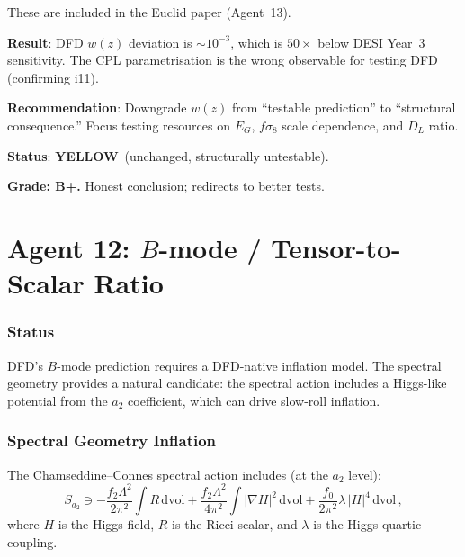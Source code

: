 \documentclass[11pt,a4paper]{article}
\newcommand{\YELLOW}{\textcolor{dfdyellow}{\textbf{YELLOW}}}
\begin{document}
These are included in the Euclid paper (Agent~13).

\begin{tcolorbox}[colback=yellow!5!white, colframe=yellow!60!black, title={Agent 11: $w(z)$ --- YELLOW (Structurally Small Signal)}]
\textbf{Result}: DFD $w(z)$ deviation is $\sim 10^{-3}$, which is $50\times$ below DESI Year~3 sensitivity. The CPL parametrisation is the wrong observable for testing DFD (confirming i11).

\textbf{Recommendation}: Downgrade $w(z)$ from ``testable prediction'' to ``structural consequence.'' Focus testing resources on $E_G$, $f\sigma_8$ scale dependence, and $D_L$ ratio.

\textbf{Status}: \YELLOW\ (unchanged, structurally untestable).

\textbf{Grade: B+.} Honest conclusion; redirects to better tests.
\end{tcolorbox}


\part{Agent 12: $B$-mode / Tensor-to-Scalar Ratio}
\label{part:bmode}

\section{Status}

DFD's $B$-mode prediction requires a DFD-native inflation model. The spectral geometry provides a natural candidate: the spectral action includes a Higgs-like potential from the $a_2$ coefficient, which can drive slow-roll inflation.

\section{Spectral Geometry Inflation}

The Chamseddine--Connes spectral action includes (at the $a_2$ level):
\begin{equation}
S_{a_2} \ni -\frac{f_2\Lambda^2}{2\pi^2}\int R\,\mathrm{dvol} + \frac{f_2\Lambda^2}{4\pi^2}\int |\nabla H|^2\,\mathrm{dvol} + \frac{f_0}{2\pi^2}\lambda\,|H|^4\,\mathrm{dvol}\,,
\end{equation}
where $H$ is the Higgs field, $R$ is the Ricci scalar, and $\lambda$ is the Higgs quartic coupling.
\end{document}
